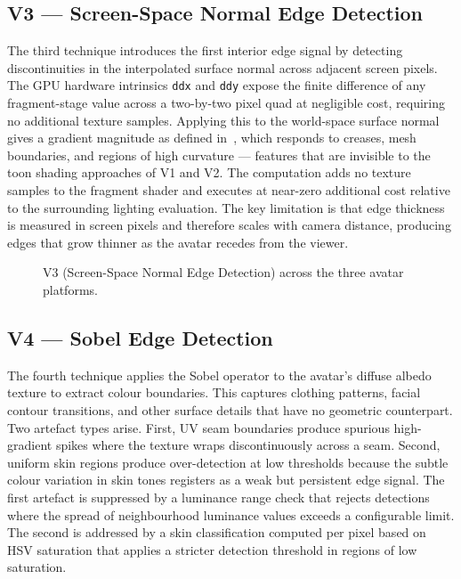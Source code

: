\subsection{V3 — Screen-Space Normal Edge Detection}
\label{sec:v3}

The third technique introduces the first interior edge signal by detecting discontinuities in the interpolated surface normal across adjacent screen pixels. The GPU hardware intrinsics \texttt{ddx} and \texttt{ddy} expose the finite difference of any fragment-stage value across a two-by-two pixel quad at negligible cost, requiring no additional texture samples. Applying this to the world-space surface normal gives a gradient magnitude as defined in~, which responds to creases, mesh boundaries, and regions of high curvature — features that are invisible to the toon shading approaches of V1 and V2. The computation adds no texture samples to the fragment shader and executes at near-zero additional cost relative to the surrounding lighting evaluation. The key limitation is that edge thickness is measured in screen pixels and therefore scales with camera distance, producing edges that grow thinner as the avatar recedes from the viewer.

\begin{figure}[H]
  \centering
  \caption{V3 (Screen-Space Normal Edge Detection) across the three avatar platforms.}
  \label{fig:v3_platforms}
\end{figure}

\subsection{V4 — Sobel Edge Detection}
\label{sec:v4}

The fourth technique applies the Sobel operator to the avatar's diffuse albedo texture to extract colour boundaries. This captures clothing patterns, facial contour transitions, and other surface details that have no geometric counterpart. Two artefact types arise. First, UV seam boundaries produce spurious high-gradient spikes where the texture wraps discontinuously across a seam. Second, uniform skin regions produce over-detection at low thresholds because the subtle colour variation in skin tones registers as a weak but persistent edge signal. The first artefact is suppressed by a luminance range check that rejects detections where the spread of neighbourhood luminance values exceeds a configurable limit. The second is addressed by a skin classification computed per pixel based on HSV saturation that applies a stricter detection threshold in regions of low saturation.

